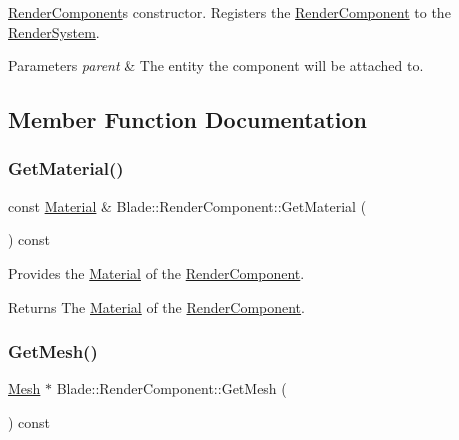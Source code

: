 \hyperlink{class_blade_1_1_render_component}{Render\+Component}\textquotesingle{}s constructor. Registers the \hyperlink{class_blade_1_1_render_component}{Render\+Component} to the \hyperlink{class_blade_1_1_render_system}{Render\+System}. 


\begin{DoxyParams}{Parameters}
{\em parent} & The entity the component will be attached to. \\
\hline
\end{DoxyParams}


\subsection{Member Function Documentation}
\mbox{\label{class_blade_1_1_render_component_a8d8d98cd4f9e559160fcb9ebcaf07fbb}} 
\subsubsection{\texorpdfstring{Get\+Material()}{GetMaterial()}}
{\footnotesize\ttfamily const \hyperlink{struct_blade_1_1_material}{Material} \& Blade\+::\+Render\+Component\+::\+Get\+Material (\begin{DoxyParamCaption}{ }\end{DoxyParamCaption}) const\hspace{0.3cm}{\ttfamily [noexcept]}}



Provides the \hyperlink{struct_blade_1_1_material}{Material} of the \hyperlink{class_blade_1_1_render_component}{Render\+Component}. 

\begin{DoxyReturn}{Returns}
The \hyperlink{struct_blade_1_1_material}{Material} of the \hyperlink{class_blade_1_1_render_component}{Render\+Component}. 
\end{DoxyReturn}
\mbox{\label{class_blade_1_1_render_component_acd44eb4419c5c412fbaf080b039b3f44}} 
\subsubsection{\texorpdfstring{Get\+Mesh()}{GetMesh()}}
{\footnotesize\ttfamily \hyperlink{class_blade_1_1_mesh}{Mesh} $\ast$ Blade\+::\+Render\+Component\+::\+Get\+Mesh (\begin{DoxyParamCaption}{ }\end{DoxyParamCaption}) const\hspace{0.3cm}{\ttfamily [noexcept]}}



